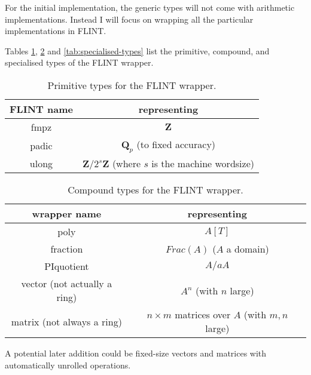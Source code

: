 \documentclass{scrartcl}
\begin{document}
For the initial implementation, the generic types will not come with
arithmetic implementations. Instead I will focus on wrapping all the
particular implementations in FLINT.

Tables \ref{tab:primitive-types}, \ref{tab:compound-types} and
\ref{tab:specialised-types} list the primitive, compound, and specialised
types of the FLINT wrapper.

\begin{table}[h]
\begin{center}
\begin{tabular}{cc}
FLINT name & representing \\
\hline
fmpz & $\mathbf{Z}$ \\
padic & $\mathbf{Q}_p$ (to fixed accuracy) \\
ulong & $\mathbf{Z}/2^{s}\mathbf{Z}$ (where $s$ is the machine wordsize) \\
\end{tabular}
\end{center}
\caption{Primitive types for the FLINT wrapper.}
\label{tab:primitive-types}
\end{table}

\begin{table}[h]
\begin{center}
\begin{tabular}{cc}
wrapper name & representing \\
\hline
poly & $A[T]$ \\
fraction & $Frac(A)$ ($A$ a domain) \\
PIquotient & $A/aA$ \\
vector (not actually a ring) & $A^n$ (with $n$ large) \\
matrix (not always a ring) & $n \times m$ matrices over $A$ (with $m, n$ large) \\
\end{tabular}
\end{center}
\caption{Compound types for the FLINT wrapper.}
\label{tab:compound-types}
\end{table}

A potential later addition could be fixed-size vectors and matrices with
automatically unrolled operations.
\end{document}
